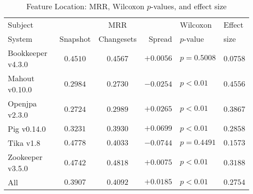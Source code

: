 \begin{table}[t]
\centering
\caption{Feature Location: MRR, Wilcoxon $p$-values, and effect size}
\begin{tabular}{l|ccr|ll}
\toprule
Subject & & MRR & & Wilcoxon & Effect \\
System  &  Snapshot & Changesets & Spread & $p$-value & size \\
\midrule
Bookkeeper v4.3.0 & $0.4510$ & $\bm{0.4567}$ & $+0.0056$ & $p = 0.5008$ & $0.0758$ \\
Mahout v0.10.0 & $\bm{0.2984}$ & $0.2730$ & $-0.0254$ & $p < 0.01$ & $0.4556$ \\
Openjpa v2.3.0 & $0.2724$ & $\bm{0.2989}$ & $+0.0265$ & $p < 0.01$ & $0.3867$ \\
Pig v0.14.0 & $0.3231$ & $\bm{0.3930}$ & $+0.0699$ & $p < 0.01$ & $0.2858$ \\
Tika v1.8 & $\bm{0.4778}$ & $0.4033$ & $-0.0744$ & $p = 0.4491$ & $0.1573$ \\
Zookeeper v3.5.0 & $0.4742$ & $\bm{0.4818}$ & $+0.0075$ & $p < 0.01$ & $0.3188$ \\
\midrule
All & $0.3907$ & $\bm{0.4092}$ & $+0.0185$ & $p < 0.01$ & $0.2754$ \\
\bottomrule
\end{tabular}
\label{table:feature_location_rq1}
\end{table}

